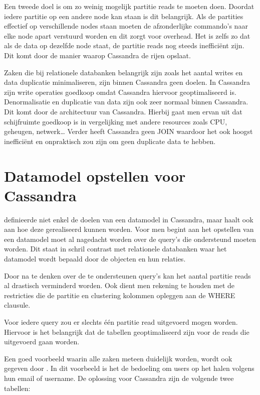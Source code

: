 Een tweede doel is om zo weinig mogelijk partitie reads te moeten doen.
Doordat iedere partitie op een andere node kan staan is dit belangrijk.
Als de partities effectief op verschillende nodes staan moeten de afzonderlijke commando's naar elke node apart verstuurd worden en dit zorgt voor overhead.
Het is zelfs zo dat als de data op dezelfde node staat, de partitie reads nog steeds inefficiënt zijn.
Dit komt door de manier waarop Cassandra de rijen opslaat.

Zaken die bij relationele databanken belangrijk zijn zoals het aantal writes en data duplicatie minimaliseren, zijn binnen Cassandra geen doelen.
In Cassandra zijn write operaties goedkoop omdat Cassandra hiervoor geoptimaliseerd is.
Denormalisatie en duplicatie van data zijn ook zeer normaal binnen Cassandra.
Dit komt door de architectuur van Cassandra.
Hierbij gaat men ervan uit dat schijfruimte goedkoop is in vergelijking met andere resources zoals CPU, geheugen, netwerk\dots
Verder heeft Cassandra geen JOIN waardoor het ook hoogst inefficiënt en onpraktisch zou zijn om geen duplicate data te hebben.

\section{Datamodel opstellen voor Cassandra}
\cite{Hobbs2015Datamodelling} definieerde niet enkel de doelen van een datamodel in Cassandra, maar haalt ook aan hoe deze gerealiseerd kunnen worden.
Voor men begint aan het opstellen van een datamodel moet al nagedacht worden over de query's die ondersteund moeten worden.
Dit staat in schril contrast met relationele databanken waar het datamodel wordt bepaald door de objecten en hun relaties.

Door na te denken over de te ondersteunen query's kan het aantal partitie reads al drastisch verminderd worden.
Ook dient men rekening te houden met de restricties die de partitie en clustering kolommen opleggen aan de WHERE clausule.

Voor iedere query zou er slechts één partitie read uitgevoerd mogen worden.
Hiervoor is het belangrijk dat de tabellen geoptimaliseerd zijn voor de reads die uitgevoerd gaan worden.

Een goed voorbeeld waarin alle zaken meteen duidelijk worden, wordt ook gegeven door \cite{Hobbs2015Datamodelling} .
In dit voorbeeld is het de bedoeling om users op het halen volgens hun email of username.
De oplossing voor Cassandra zijn de volgende twee tabellen:

